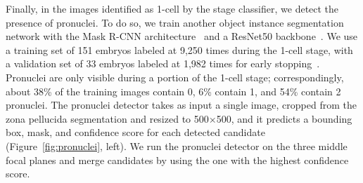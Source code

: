 
 Finally, in the images identified as 1-cell by the stage classifier, we detect the presence of pronuclei. To do so, we train another object instance segmentation network with the Mask R-CNN architecture~\cite{he2017mask} and a ResNet50 backbone~\cite{he2016deep}. We use a training set of 151 embryos labeled at 9,250 times during the 1-cell stage, with a validation set of 33 embryos labeled at 1,982 times for early stopping~\cite{goodfellow2016deep}. Pronuclei are only visible during a portion of the 1-cell stage; correspondingly, about 38\% of the training images contain 0, 6\% contain 1, and 54\% contain 2 pronuclei. The pronuclei detector takes as input a single image, cropped from the zona pellucida segmentation and resized to 500$\times$500, and it predicts a bounding box, mask, and confidence score for each detected candidate (Figure~\ref{fig:pronuclei}, left). We run the pronuclei detector on the three middle focal planes and merge candidates by using the one with the highest confidence score.

